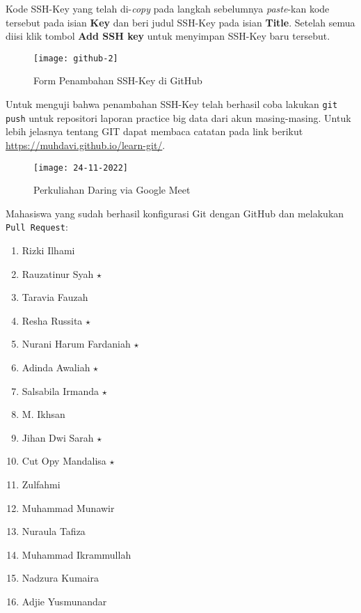 \documentclass[a4paper]{tufte-handout}
\begin{document}
\begin{enumerate}
Kode SSH-Key yang telah di-\textit{copy} pada langkah sebelumnya \textit{paste}-kan kode tersebut pada isian \textbf{Key} dan beri judul SSH-Key pada isian \textbf{Title}. Setelah semua diisi klik tombol \textbf{Add SSH key} untuk menyimpan SSH-Key baru tersebut.

\begin{figure}[!ht]
\texttt{[image: github-2]}
\caption{Form Penambahan SSH-Key di GitHub}
\label{gam:tambah-ssh}
\end{figure}

Untuk menguji bahwa penambahan SSH-Key telah berhasil coba lakukan {\tt git push} untuk repositori laporan practice big data dari akun masing-masing. Untuk lebih jelasnya tentang GIT dapat membaca catatan pada link berikut \url{https://muhdavi.github.io/learn-git/}.
\end{enumerate}

\begin{figure}[!ht]
\texttt{[image: 24-11-2022]}
\caption{Perkuliahan Daring via Google Meet}
\label{gam:perkuliahan-24-11}
\end{figure}

\vspace*{-.5cm}
\hrulefill

\clearpage
{}


Mahasiswa yang sudah berhasil konfigurasi Git dengan GitHub dan melakukan {\tt Pull Request}:
\begin{multicols}{2}
\begin{enumerate}
\item Rizki Ilhami
\item Rauzatinur Syah $\star$
\item Taravia Fauzah
\item Resha Russita $\star$
\item Nurani Harum Fardaniah $\star$
\item Adinda Awaliah $\star$
\item Salsabila Irmanda $\star$
\item M. Ikhsan
\item Jihan Dwi Sarah $\star$
\item Cut Opy Mandalisa $\star$
\item Zulfahmi
\item Muhammad Munawir
\item Nuraula Tafiza
\item Muhammad Ikrammullah
\item Nadzura Kumaira
\item Adjie Yusmunandar
\end{enumerate}
\end{multicols}
\end{document}
